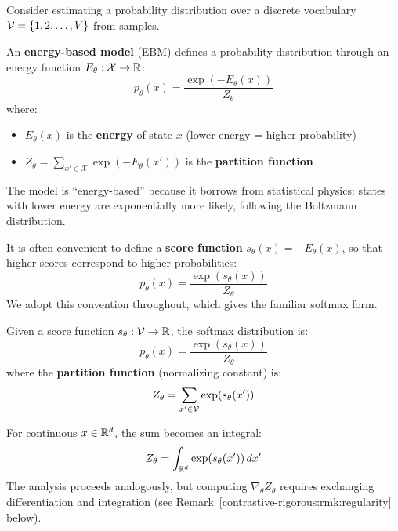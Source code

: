 \begin{notechapter}
Consider estimating a probability distribution over a discrete vocabulary $\mathcal{V} = \{1, 2, \ldots, V\}$ from samples.

\begin{definition}
An \textbf{energy-based model} (EBM) defines a probability distribution through an energy function $E_\theta: \mathcal{X} \to \mathbb{R}$:
\begin{equation}
p_\theta(x) = \frac{\exp(-E_\theta(x))}{Z_\theta}
\end{equation}
where:
\begin{itemize}
    \item $E_\theta(x)$ is the \textbf{energy} of state $x$ (lower energy = higher probability)
    \item $Z_\theta = \sum_{x' \in \mathcal{X}} \exp(-E_\theta(x'))$ is the \textbf{partition function}
\end{itemize}
The model is ``energy-based'' because it borrows from statistical physics: states with lower energy are exponentially more likely, following the Boltzmann distribution.
\end{definition}

\begin{remark}
It is often convenient to define a \textbf{score function} $s_\theta(x) = -E_\theta(x)$, so that higher scores correspond to higher probabilities:
\begin{equation}
p_\theta(x) = \frac{\exp(s_\theta(x))}{Z_\theta}
\end{equation}
We adopt this convention throughout, which gives the familiar softmax form.
\end{remark}

\begin{definition}
Given a score function $s_\theta: \mathcal{V} \to \mathbb{R}$, the softmax distribution is:
\begin{equation}
p_\theta(x) = \frac{\exp(s_\theta(x))}{Z_\theta}
\end{equation}
where the \textbf{partition function} (normalizing constant) is:
\begin{equation}
Z_\theta = \sum_{x' \in \mathcal{V}} \exp(s_\theta(x'))
\end{equation}
\end{definition}

\begin{remark}
For continuous $x \in \mathbb{R}^d$, the sum becomes an integral:
\begin{equation}
Z_\theta = \int_{\mathbb{R}^d} \exp(s_\theta(x')) \, dx'
\end{equation}
The analysis proceeds analogously, but computing $\nabla_\theta Z_\theta$ requires exchanging differentiation and integration (see Remark~\ref{contrastive-rigorous:rmk:regularity} below).
\end{remark}


\end{notechapter}
